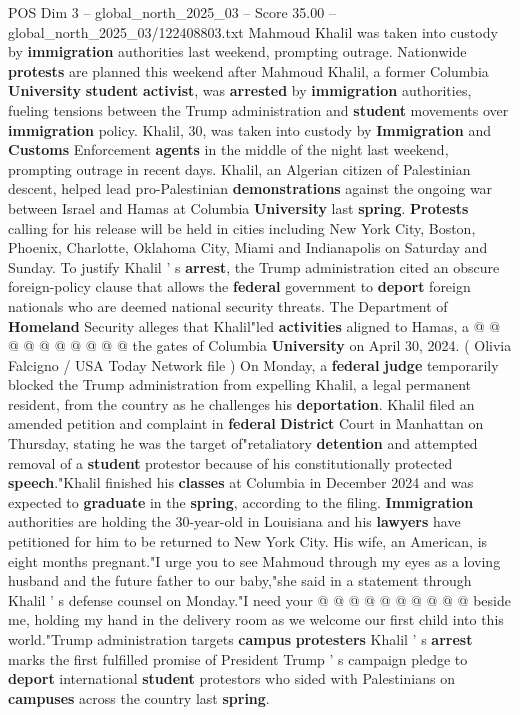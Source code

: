 \begin{textsample}{POS Dim 3 – global\_north\_2025\_03 – Score 35.00 – global\_north\_2025\_03/122408803.txt}  \label{ex:f3_pos_024}
Mahmoud Khalil was taken into custody by \textbf{immigration} authorities last weekend, prompting outrage.
Nationwide \textbf{protests} are planned this weekend after Mahmoud Khalil, a former Columbia \textbf{University} \textbf{student} \textbf{activist}, was \textbf{arrested} by \textbf{immigration} authorities, fueling tensions between the Trump administration and \textbf{student} movements over \textbf{immigration} policy.
Khalil, 30, was taken into custody by \textbf{Immigration} and \textbf{Customs} Enforcement \textbf{agents} in the middle of the night last weekend, prompting outrage in recent days.
Khalil, an Algerian citizen of Palestinian descent, helped lead pro-Palestinian \textbf{demonstrations} against the ongoing war between Israel and Hamas at Columbia \textbf{University} last \textbf{spring}. \textbf{Protests} calling for his release will be held in cities including New York City, Boston, Phoenix, Charlotte, Oklahoma City, Miami and Indianapolis on Saturday and Sunday.
To justify Khalil ' s \textbf{arrest}, the Trump administration cited an obscure foreign-policy clause that allows the \textbf{federal} government to \textbf{deport} foreign nationals who are deemed national security threats.
The Department of \textbf{Homeland} Security alleges that Khalil"led \textbf{activities} aligned to Hamas, a @ @ @ @ @ @ @ @ @ @ the gates of Columbia \textbf{University} on April 30, 2024. ( Olivia Falcigno / USA Today Network file ) On Monday, a \textbf{federal} \textbf{judge} temporarily blocked the Trump administration from expelling Khalil, a legal permanent resident, from the country as he challenges his \textbf{deportation}.
Khalil filed an amended petition and complaint in \textbf{federal} \textbf{District} Court in Manhattan on Thursday, stating he was the target of"retaliatory \textbf{detention} and attempted removal of a \textbf{student} protestor because of his constitutionally protected \textbf{speech}."Khalil finished his \textbf{classes} at Columbia in December 2024 and was expected to \textbf{graduate} in the \textbf{spring}, according to the filing. \textbf{Immigration} authorities are holding the 30-year-old in Louisiana and his \textbf{lawyers} have petitioned for him to be returned to New York City.
His wife, an American, is eight months pregnant."I urge you to see Mahmoud through my eyes as a loving husband and the future father to our baby,"she said in a statement through Khalil ' s defense counsel on Monday."I need your @ @ @ @ @ @ @ @ @ @ beside me, holding my hand in the delivery room as we welcome our first child into this world."Trump administration targets \textbf{campus} \textbf{protesters} Khalil ' s \textbf{arrest} marks the first fulfilled promise of President Trump ' s campaign pledge to \textbf{deport} international \textbf{student} protestors who sided with Palestinians on \textbf{campuses} across the country last \textbf{spring}.

\end{textsample}
